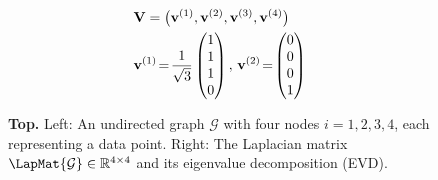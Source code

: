 {{\begin{figure}[H]
\begin{center}
\begin{minipage}{0.4\textwidth}
\begin{equation}
					\end{equation} 
				\end{minipage}
				\vspace*{20mm}\\
				  \begin{minipage}{0.4\textwidth}
				\end{minipage} 
    		\begin{minipage}{0.4\textwidth}
										\begin{align}
											& \mathbf{V} = \big( {\bf v}^{(1)},{\bf v}^{(2)},{\bf v}^{(3)},{\bf v}^{(4)} \big) \nonumber \\
											&	\mathbf{v}^{(1)}\!=\!\frac{1}{\sqrt{3}} \begin{pmatrix} 1 \\ 1 \\ 1 \\ 0 \end{pmatrix}, \,
												\mathbf{v}^{(2)}\!=\!\begin{pmatrix} 0 \\ 0 \\ 0 \\ 1 \end{pmatrix} \nonumber 
												\end{align}
				\end{minipage} 
				\caption{\label{fig_lap_mtx_specclustering_dict} {\bf Top.} Left: An undirected graph 
					$\mathcal{G}$ with four nodes $i=1,2,3,4$, each representing a data point. Right: The Laplacian matrix 
					$\LapMat{\mathcal{G}}  \in \mathbb{R}^{4 \times 4}$ and its eigenvalue decomposition (EVD). 
}
\end{center}
\end{figure}}}
